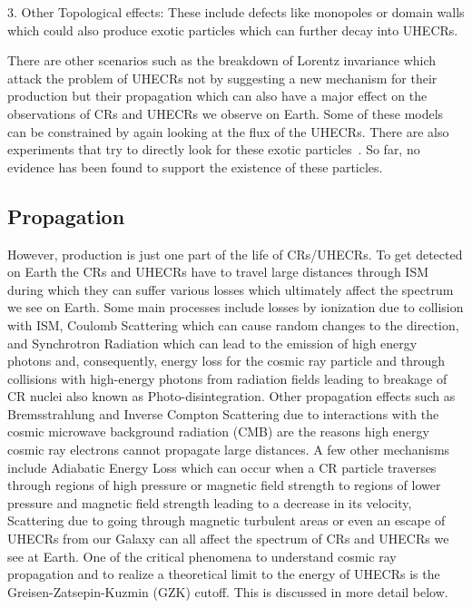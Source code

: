 3. Other Topological effects: These include defects like monopoles or domain walls which could also produce exotic particles which can further decay into UHECRs.~\cite{PhysRevLett.79.5202} 

There are other scenarios such as the breakdown of Lorentz invariance which attack the problem of UHECRs not by suggesting a new mechanism for their production but their propagation which can also have a major effect on the observations of CRs and UHECRs we observe on Earth. Some of these models can be constrained by again looking at the flux of the UHECRs. There are also experiments that try to directly look for these exotic particles~\cite{}. So far, no evidence has been found to support the existence of these particles. 

\subsection{Propagation}
\label{subsec:crprop}
However, production is just one part of the life of CRs/UHECRs. To get detected on Earth the CRs and UHECRs have to travel large distances through ISM during which they can suffer various losses which ultimately affect the spectrum we see on Earth. Some main processes include losses by ionization due to collision with ISM, Coulomb Scattering which can cause random changes to the direction, and Synchrotron Radiation which can lead to the emission of high energy photons and, consequently, energy loss for the cosmic ray particle and through collisions with high-energy photons from radiation fields leading to breakage of CR nuclei also known as Photo-disintegration. Other propagation effects such as Bremsstrahlung and Inverse Compton Scattering due to interactions with the cosmic microwave background radiation (CMB) are the reasons high energy cosmic ray electrons cannot propagate large distances. A few other mechanisms include Adiabatic Energy Loss which can occur when a CR particle traverses through regions of high pressure or magnetic field strength to regions of lower pressure and magnetic field strength leading to a decrease in its velocity, Scattering due to going through magnetic turbulent areas or even an escape of UHECRs from our Galaxy can all affect the spectrum of CRs and UHECRs we see at Earth. One of the critical phenomena to understand cosmic ray propagation and to realize a theoretical limit to the energy of UHECRs is the Greisen-Zatsepin-Kuzmin (GZK) cutoff. This is discussed in more detail below.

